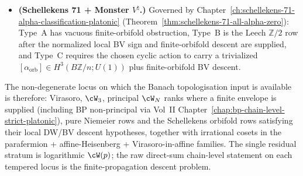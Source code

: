\begin{remark}
\begin{itemize}[nosep]
 (Theorem~\ref{thm:irrational-coset-tempered}), through the refined
 VSKR + BGG tempering criterion.
\item \textbf{(Schellekens 71 + Monster $V^\natural$.)} Governed by
 Chapter~\ref{ch:schellekens-71-alpha-classification-platonic}
 (Theorem~\ref{thm:schellekens-71-all-alpha-zero}): Type~A has
 vacuous finite-orbifold obstruction, Type~B is the Leech
 $\mathbb Z/2$ row after the normalized local BV sign and
 finite-orbifold descent are supplied, and Type~C requires the
 chosen cyclic action to carry a trivialized
 $[\alpha_{\mathrm{orb}}]\in H^3(B\mathbb Z/n;U(1))$ plus
 finite-orbifold BV descent.
\end{itemize}
The non-degenerate locus on which the Banach topologisation input is
available is therefore: Virasoro, $\cW_3$, principal $\cW_N$ ranks
where a finite envelope is supplied (including BP non-principal via
Vol~II Chapter~\ref{chap:bp-chain-level-strict-platonic}),
pure Niemeier rows and the Schellekens orbifold rows satisfying their
local DW/BV descent hypotheses, together with irrational cosets in the
parafermion + affine-Heisenberg + Virasoro-in-affine families.
The single residual stratum is logarithmic $\cW(p)$; the raw
direct-sum chain-level statement on each tempered locus is the
finite-propagation descent problem.
\end{remark}
